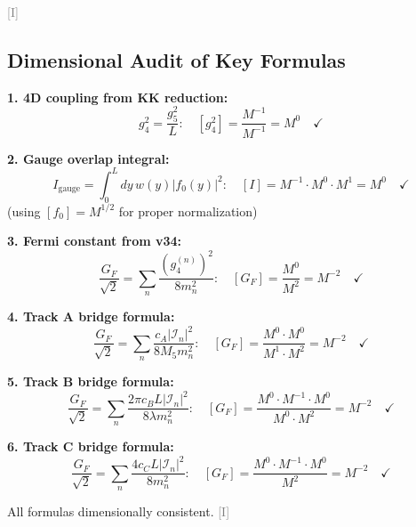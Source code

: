\documentclass[11pt,a4paper]{article}
\newcommand{\tagI}{\textcolor{gray}{[I]}}
\begin{document}
\tagI

\subsection{Dimensional Audit of Key Formulas}

\begin{resultbox}
\textbf{1. 4D coupling from KK reduction:}
\begin{equation}
\label{eq:audit-g4}
g_4^2 = \frac{g_5^2}{L}: \quad [g_4^2] = \frac{M^{-1}}{M^{-1}} = M^0 \quad \checkmark
\end{equation}

\textbf{2. Gauge overlap integral:}
\begin{equation}
\label{eq:audit-Igauge}
I_{\text{gauge}} = \int_0^L dy\, w(y)|f_0(y)|^2: \quad [I] = M^{-1} \cdot M^0 \cdot M^1 = M^0 \quad \checkmark
\end{equation}
(using $[f_0] = M^{1/2}$ for proper normalization)

\textbf{3. Fermi constant from v34:}
\begin{equation}
\label{eq:audit-GF}
\frac{G_F}{\sqrt{2}} = \sum_n \frac{(g_4^{(n)})^2}{8 m_n^2}: \quad [G_F] = \frac{M^0}{M^2} = M^{-2} \quad \checkmark
\end{equation}

\textbf{4. Track A bridge formula:}
\begin{equation}
\label{eq:audit-track-a}
\frac{G_F}{\sqrt{2}} = \sum_n \frac{c_A |\mathcal{I}_n|^2}{8 M_5 m_n^2}: \quad [G_F] = \frac{M^0 \cdot M^0}{M^1 \cdot M^2} = M^{-2} \quad \checkmark
\end{equation}

\textbf{5. Track B bridge formula:}
\begin{equation}
\label{eq:audit-track-b}
\frac{G_F}{\sqrt{2}} = \sum_n \frac{2\pi c_B L |\mathcal{I}_n|^2}{8\lambda m_n^2}: \quad [G_F] = \frac{M^0 \cdot M^{-1} \cdot M^0}{M^0 \cdot M^2} = M^{-2} \quad \checkmark
\end{equation}

\textbf{6. Track C bridge formula:}
\begin{equation}
\label{eq:audit-track-c}
\frac{G_F}{\sqrt{2}} = \sum_n \frac{4c_C L |\mathcal{I}_n|^2}{8 m_n^2}: \quad [G_F] = \frac{M^0 \cdot M^{-1} \cdot M^0}{M^2} = M^{-2} \quad \checkmark
\end{equation}

All formulas dimensionally consistent. \tagI
\end{resultbox}
\end{document}
